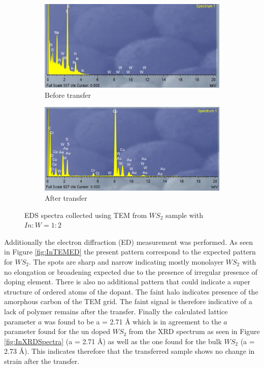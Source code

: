 \begin{figure}[!ht]
	\begin{center}
			\begin{subfigure}[b]{0.6\textwidth}
			\includegraphics[width=\textwidth]{In/TEMEDSFra.png}
			\caption{Before transfer}
			\label{fig:InTEMEDSFra}
		\end{subfigure}
		\qquad
		\begin{subfigure}[b]{0.6\textwidth}
			\includegraphics[width=\textwidth]{In/TEMEDS.png}
			\caption{After transfer}
			\label{fig:InTEMEDS}
		\end{subfigure}
		\caption{EDS spectra collected using TEM from $WS_2$ sample with $In:W = 1:2$}
		\label{fig:InTEMEDSSpectra}
	\end{center}
\end{figure}

Additionally the electron diffraction (ED) measurement was performed. As seen in Figure \ref{fig:InTEMED} the present pattern correspond to the expected pattern for $WS_2$. The spots are sharp and narrow indicating mostly monolayer $WS_2$ with no elongation or broadening expected due to the presence of irregular presence of doping element. There is also no additional pattern that could indicate a super structure of ordered atoms of the dopant. The faint halo indicates presence of the amorphous carbon of the TEM grid. The faint signal is therefore indicative of a lack of polymer remains after the transfer. Finally the calculated lattice parameter $a$ was found to be a = 2.71 \r{A} which is in agreement to the $a$ parameter found for the un doped $WS_2$ from the XRD spectrum as seen in Figure \ref{fig:InXRDSpectra} (a = 2.71 \r{A}) as well as the  one found for the bulk $WS_2$ (a = 2.73 \r{A}). This indicates therefore that the transferred sample shows no change in strain after the transfer.

